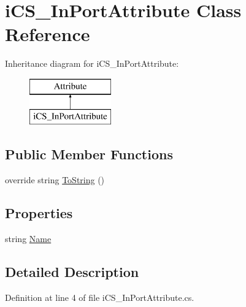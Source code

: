 \hypertarget{classi_c_s___in_port_attribute}{\section{i\+C\+S\+\_\+\+In\+Port\+Attribute Class Reference}
\label{classi_c_s___in_port_attribute}
}
Inheritance diagram for i\+C\+S\+\_\+\+In\+Port\+Attribute\+:\begin{figure}[H]
\begin{center}
\leavevmode
\includegraphics[height=2.000000cm]{classi_c_s___in_port_attribute}
\end{center}
\end{figure}
\subsection*{Public Member Functions}
\begin{DoxyCompactItemize}
\item 
override string \hyperlink{classi_c_s___in_port_attribute_a81123c36f37c536c59d978be1a4643d3}{To\+String} ()
\end{DoxyCompactItemize}
\subsection*{Properties}
\begin{DoxyCompactItemize}
\item 
string \hyperlink{classi_c_s___in_port_attribute_a1c9818eb7f4a6f2059bd9c2c4c385c19}{Name}
\end{DoxyCompactItemize}


\subsection{Detailed Description}


Definition at line 4 of file i\+C\+S\+\_\+\+In\+Port\+Attribute.\+cs.



